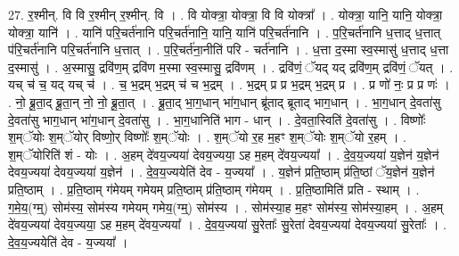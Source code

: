 \documentclass[17pt]{extarticle}
\begin{document}
27. र॒श्मीन्. वि वि र॒श्मीन् र॒श्मीन्. वि । . वि योक्त्रा॒ योक्त्रा॒ वि वि योक्त्रा᳚ । . योक्त्रा॒ यानि॒ यानि॒ योक्त्रा॒ योक्त्रा॒ यानि॑ । . यानि॑ परि॒चर्त॑नानि परि॒चर्त॑नानि॒ यानि॒ यानि॑ परि॒चर्त॑नानि । . प॒रि॒चर्त॑नानि ध॒त्ताद् ध॒त्तात् प॑रि॒चर्त॑नानि परि॒चर्त॑नानि ध॒त्तात् । . प॒रि॒चर्त॑ना॒नीति॑ परि - चर्त॑नानि । . ध॒त्ता द॒स्मा स्व॒स्मासु॑ ध॒त्ताद् ध॒त्ता द॒स्मासु॑ । . अ॒स्मासु॒ द्रवि॑ण॒म् द्रवि॑ण म॒स्मा स्व॒स्मासु॒ द्रवि॑णम् । . द्रवि॑णं॒ ॅयद् यद् द्रवि॑ण॒म् द्रवि॑णं॒ ॅयत् । . यच् च॑ च॒ यद् यच् च॑ । . च॒ भ॒द्रम् भ॒द्रम् च॑ च भ॒द्रम् । . भ॒द्रम् प्र प्र भ॒द्रम् भ॒द्रम् प्र । . प्र णो॑ नः॒ प्र प्र णः॑ । . नो॒ ब्रू॒ता॒द् ब्रू॒ता॒न् नो॒ नो॒ ब्रू॒ता॒त् । . ब्रू॒ता॒द् भा॒ग॒धान् भा॑ग॒धान् ब्रू॑ताद् ब्रूताद् भाग॒धान् । . भा॒ग॒धान् दे॒वता॑सु दे॒वता॑सु भाग॒धान् भा॑ग॒धान् दे॒वता॑सु । . भा॒ग॒धानिति॑ भाग - धान् । . दे॒वता॒स्विति॑ दे॒वता॑सु । . विष्णोः᳚ श॒म्ॅयोः श॒म्ॅयोर् विष्णो॒र् विष्णोः᳚ श॒म्ॅयोः । . श॒म्ॅयो र॒ह म॒हꣳ श॒म्ॅयोः श॒म्ॅयो र॒हम् । . श॒म्ॅयोरिति॑ शं - योः । . अ॒हम् दे॑वय॒ज्यया॑ देवय॒ज्यया॒ ऽह म॒हम् दे॑वय॒ज्यया᳚ । . दे॒व॒य॒ज्यया॑ य॒ज्ञेन॑ य॒ज्ञेन॑ देवय॒ज्यया॑ देवय॒ज्यया॑ य॒ज्ञेन॑ । . दे॒व॒य॒ज्ययेति॑ देव - य॒ज्यया᳚ । . य॒ज्ञेन॑ प्रति॒ष्ठाम् प्र॑ति॒ष्ठां ॅय॒ज्ञेन॑ य॒ज्ञेन॑ प्रति॒ष्ठाम् । . प्र॒ति॒ष्ठाम् ग॑मेयम् गमेयम् प्रति॒ष्ठाम् प्र॑ति॒ष्ठाम् ग॑मेयम् । . प्र॒ति॒ष्ठामिति॑ प्रति - स्थाम् । . ग॒मे॒य॒(ग्म्॒) सोम॑स्य॒ सोम॑स्य गमेयम् गमेय॒(ग्म्॒) सोम॑स्य । . सोम॑स्या॒ह म॒हꣳ सोम॑स्य॒ सोम॑स्या॒हम् । . अ॒हम् दे॑वय॒ज्यया॑ देवय॒ज्यया॒ ऽह म॒हम् दे॑वय॒ज्यया᳚ । . दे॒व॒य॒ज्यया॑ सु॒रेताः᳚ सु॒रेता॑ देवय॒ज्यया॑ देवय॒ज्यया॑ सु॒रेताः᳚ । . दे॒व॒य॒ज्ययेति॑ देव - य॒ज्यया᳚ । \newline
\end{document}
